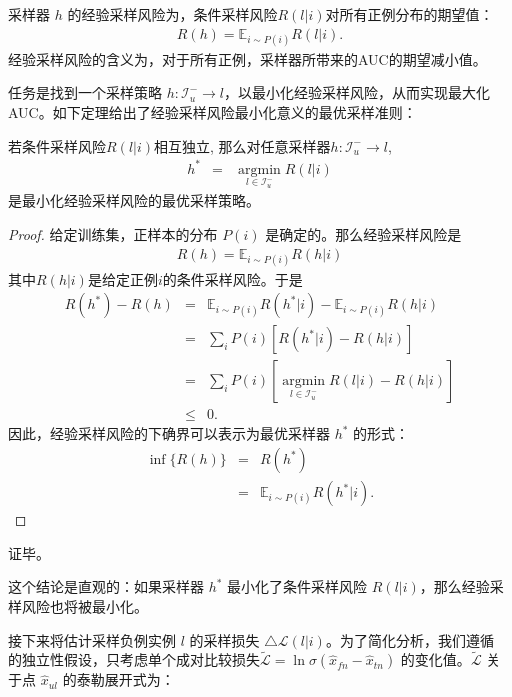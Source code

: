 \begin{definition}[经验采样风险]
采样器 $h$ 的经验采样风险为，条件采样风险$R(l|i)$对所有正例分布的期望值：
	\begin{eqnarray}
		R(h) = \mathbb{E}_{i \sim P(i)} R(l|i).
	\end{eqnarray}
经验采样风险的含义为，对于所有正例，采样器所带来的AUC的期望减小值。
\end{definition}
任务是找到一个采样策略 $h:\mathcal{I}_u^- \rightarrow l$，以最小化经验采样风险，从而实现最大化AUC。如下定理给出了经验采样风险最小化意义的最优采样准则：
\begin{theorem}[最优采样准则] \label{optimalrule}
若条件采样风险$R(l|i)$相互独立, 那么对任意采样器$h: \mathcal{I}_u^- \rightarrow l$,
	\begin{eqnarray}\label{Eq:OptimalSam}
		h^* &=&   \mathop{\arg\min}\limits_{l \in\mathcal{I}_u^-} R(l|i)
	\end{eqnarray}
是最小化经验采样风险的最优采样策略。
	\begin{proof}
给定训练集，正样本的分布 $P(i)$ 是确定的。那么经验采样风险是
		\begin{eqnarray}
			R(h) = \mathbb{E}_{i \sim P(i) } R(h|i)
		\end{eqnarray}
其中$R(h|i)$是给定正例$i$的条件采样风险。于是
		\begin{eqnarray}
	R(h^*) - R(h)
			&=&	\mathbb{E}_{i \sim P(i) }  R(h^*|i) - \mathbb{E}_{i \sim P(i) }  R(h|i)  \nonumber \\
			&=& \sum_i P(i)  [R(h^*|i) - R(h|i)] \nonumber \\
			&=& \sum_i P(i)  [  \mathop{\arg\min}\limits_{l \in\mathcal{I}_u^-} R(l|i)  - R(h|i)]\nonumber \\
			&\leq& 0.
		\end{eqnarray}
因此，经验采样风险的下确界可以表示为最优采样器 $h^*$ 的形式：
		\begin{eqnarray}
			\inf \{R(h)\} 	&=& R(h^*) \nonumber\\
			&=& \mathbb{E}_{i \sim P(i) } R(h^*|i).
		\end{eqnarray}
	\end{proof}
证毕。
\end{theorem}
这个结论是直观的：如果采样器 $h^*$ 最小化了条件采样风险 $R(l|i)$，那么经验采样风险也将被最小化。

接下来将估计采样负例实例 $l$ 的采样损失 $\triangle \mathcal{L}(l|i)$。为了简化分析，我们遵循~\cite{Steffen:2009:UAI} 的独立性假设，只考虑单个成对比较损失$\tilde{\mathcal{L}}= \ln \sigma(\hat{x}_{fn} - \hat{x}_{tn})$ 的变化值。$\tilde{\mathcal{L}}$ 关于点 $\hat{x}_{ul}$ 的泰勒展开式为：





